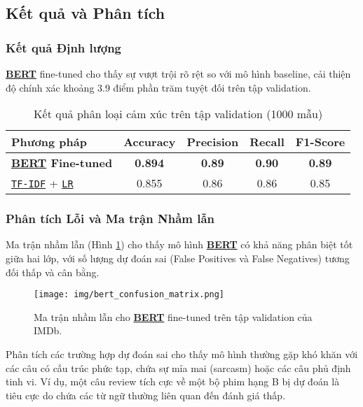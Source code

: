 \subsection{Kết quả và Phân tích}
\label{ssec:ket_qua_phan_tich_app}

\subsubsection{Kết quả Định lượng}
\hyperref[acro:bert]{\textbf{BERT}} fine-tuned cho thấy sự vượt trội rõ rệt so với mô hình baseline, cải thiện độ chính xác khoảng 3.9 điểm phần trăm tuyệt đối trên tập validation.

\begin{table}[H]
\centering
\caption{Kết quả phân loại cảm xúc trên tập validation (1000 mẫu)}
\label{tab:results_summary_app}
\begin{tabular}{lcccc}
\toprule
\textbf{Phương pháp} & \textbf{Accuracy} & \textbf{Precision} & \textbf{Recall} & \textbf{F1-Score} \\
\midrule
\textbf{\hyperref[acro:bert]{\textbf{BERT}} Fine-tuned} & \textbf{0.894} & \textbf{0.89} & \textbf{0.90} & \textbf{0.89} \\
\hyperref[acro:tfidf]{\texttt{TF-IDF}} + \hyperref[acro:lr]{\texttt{LR}} & 0.855 & 0.86 & 0.86 & 0.85 \\
\bottomrule
\end{tabular}
\end{table}

\subsubsection{Phân tích Lỗi và Ma trận Nhầm lẫn}
Ma trận nhầm lẫn (Hình \ref{fig:confusion_matrix_app}) cho thấy mô hình \hyperref[acro:bert]{\textbf{BERT}} có khả năng phân biệt tốt giữa hai lớp, với số lượng dự đoán sai (False Positives và False Negatives) tương đối thấp và cân bằng.

\begin{figure}[H]
    \centering
    \texttt{[image: img/bert\_confusion\_matrix.png]}
    \caption{Ma trận nhầm lẫn cho \hyperref[acro:bert]{\textbf{BERT}} fine-tuned trên tập validation của IMDb.}
    \label{fig:confusion_matrix_app}
\end{figure}

Phân tích các trường hợp dự đoán sai cho thấy mô hình thường gặp khó khăn với các câu có cấu trúc phức tạp, chứa sự mỉa mai (sarcasm) hoặc các câu phủ định tinh vi. Ví dụ, một câu review tích cực về một bộ phim hạng B bị dự đoán là tiêu cực do chứa các từ ngữ thường liên quan đến đánh giá thấp.

